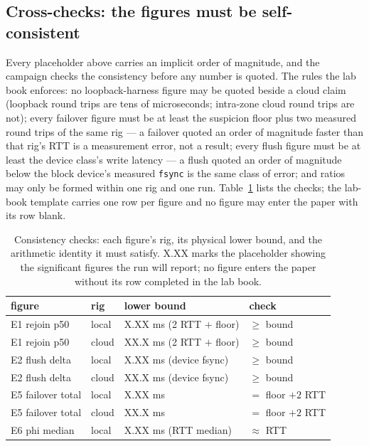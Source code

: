 \documentclass[10pt,journal,letterpaper]{IEEEtran}
\newcommand{\code}[1]{\texttt{#1}}
\begin{document}
\subsection{Cross-checks: the figures must be self-consistent}
Every placeholder above carries an implicit order of magnitude, and the
campaign checks the consistency before any number is quoted. The rules the
lab book enforces: no loopback-harness figure may be quoted beside a cloud
claim (loopback round trips are tens of microseconds; intra-zone cloud
round trips are not); every failover figure must be at least the suspicion
floor plus two measured round trips of the same rig --- a failover quoted
an order of magnitude faster than that rig's RTT is a measurement error,
not a result; every flush figure must be at least the device class's write
latency --- a flush quoted an order of magnitude below the block device's
measured \code{fsync} is the same class of error; and ratios may only be
formed within one rig and one run. Table~\ref{tab:consistency} lists the
checks; the lab-book template carries one row per figure and no figure may
enter the paper with its row blank.

\begin{table}[t]
\centering\small
\begin{tabular}{@{}llll@{}}
\toprule
figure & rig & lower bound & check \\
\midrule
E1 rejoin p50 & local & X.XX ms (2 RTT $+$ floor) & $\ge$ bound \\
E1 rejoin p50 & cloud & XX.X ms (2 RTT $+$ floor) & $\ge$ bound \\
E2 flush delta & local & X.XX ms (device fsync) & $\ge$ bound \\
E2 flush delta & cloud & XX.X ms (device fsync) & $\ge$ bound \\
E5 failover total & local & X.XX ms & $=$ floor $+2$ RTT \\
E5 failover total & cloud & XX.X ms & $=$ floor $+2$ RTT \\
E6 phi median & local & X.XX ms (RTT median) & $\approx$ RTT \\
\bottomrule
\end{tabular}
\caption{Consistency checks: each figure's rig, its physical lower bound,
and the arithmetic identity it must satisfy. X.XX marks the placeholder
showing the significant figures the run will report; no figure enters the
paper without its row completed in the lab book.}
\label{tab:consistency}
\end{table}
\end{document}
